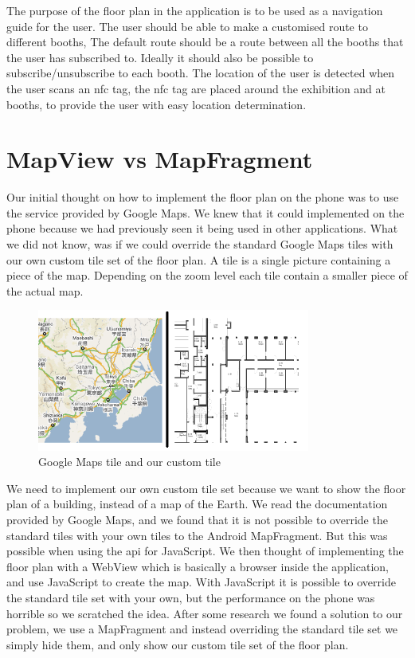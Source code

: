 The purpose of the floor plan in the application is to be used as a navigation guide for the user. The user should be able to make a customised route to different booths, The default route should be a route between all the booths that the user has subscribed to.
Ideally it should also be possible to subscribe/unsubscribe to each booth. The location of the user is detected when the user scans an \ac{nfc} tag, the \ac{nfc} tag are placed around the exhibition and at booths, to provide the user with easy location determination.

\section{MapView vs MapFragment}
Our initial thought on how to implement the floor plan on the phone was to use the service provided by Google Maps. We knew that it could implemented on the phone because we had previously seen it being used in other applications. What we did not know, was if we could override the standard Google Maps tiles with our own custom tile set of the floor plan. A tile is a single picture containing a piece of the map. Depending on the zoom level each tile contain a smaller piece of the actual map.\\
\begin{figure}[H]
\centering
\includegraphics[width=0.8\textwidth]{img/tilessidebyside.png}
\caption{Google Maps tile and our custom tile \citep{googlemaptile}}
\label{fig:maptiles}
\end{figure}
We need to implement our own custom tile set because we want to show the floor plan of a building, instead of a map of the Earth. We read the documentation provided by Google Maps\citep{googlemapsapi}, and we found that it is not possible to override the standard tiles with your own tiles to the Android MapFragment. But this was possible when using the \ac{api} for JavaScript. We then thought of implementing the floor plan with a WebView which is basically a browser inside the application, and use JavaScript to create the map. With JavaScript it is possible to override the standard tile set with your own, but the performance on the phone was horrible so we scratched the idea. After some research we found a solution to our problem, we use a MapFragment and instead overriding the standard tile set we simply hide them, and only show our custom tile set of the floor plan.

